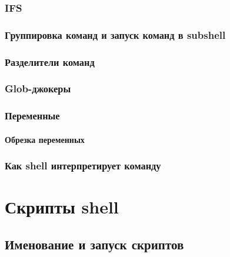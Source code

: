 \documentclass[oneside]{book}
\begin{document}
			\subsection{IFS}
			
			
			\subsection{Группировка команд и запуск команд в subshell}
			
			
			\subsection{Разделители команд}
			
			
			\subsection{Glob-джокеры}
			
			
			\subsection{Переменные}
			
						
				\subsubsection{Обрезка переменных}
				
			
			\subsection{Как shell интерпретирует команду}
			
		
	\chapter{Скрипты shell}
	
	
		\section{Именование и запуск скриптов}
		
		
\end{document}
